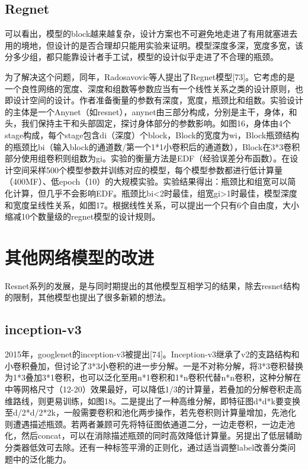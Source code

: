 \documentclass[15pt]{article}
\begin{document}
\subsection{Regnet}
可以看出，模型的block越来越复杂，设计方案也不可避免地走进了有用就塞进去用的境地，但设计的是否合理却只能用实验来证明。模型深度多深，宽度多宽，该分多少组，都只能靠设计者手工试，模型的设计似乎走进了不合理的瓶颈。

为了解决这个问题，同年，Radosavovic等人提出了Regnet模型[73]。它考虑的是一个良性网络的宽度、深度和组数等参数应当有一个线性关系之类的设计原则，也即设计空间的设计。作者准备衡量的参数有深度，宽度，瓶颈比和组数。实验设计的主体是一个Anynet（如resnet），anynet由三部分构成，分别是主干，身体，和头，我们保持主干和头部固定，探讨身体部分的参数影响。如图16，身体由4个stage构成，每个stage包含di（深度）个block，Block的宽度为wi，Block瓶颈结构的瓶颈比bi（输入block的通道数/第一个1*1小卷积后的通道数），Block在3*3卷积部分使用组卷积则组数为gi。实验的衡量方法是EDF（经验误差分布函数）。在设计空间采样500个模型参数并训练对应的模型，每个模型参数都进行低计算量（400MF）、低epoch（10）的大规模实验。实验结果得出：瓶颈比和组宽可以简化计算，但几乎不会影响EDF。瓶颈比bi<2时最佳，组宽gi>1时最佳，模型深度和宽度呈线性关系，如图17。根据线性关系，可以提出一个只有6个自由度，大小缩减10个数量级的regnet模型的设计规则。

\section{其他网络模型的改进}
Resnet系列的发展，是与同时期提出的其他模型互相学习的结果，除去resnet结构的限制，其他模型也提出了很多新颖的想法。

\subsection{inception-v3}
2015年，googlenet的inception-v3被提出[74]。Inception-v3继承了v2的支路结构和小卷积叠加，但讨论了3*3小卷积的进一步分解。一是不对称分解，将3*3卷积替换为1*3叠加3*1卷积，也可以泛化至用n*1卷积和1*n卷积代替n*n卷积，这种分解在中等网格尺寸（12-20）效果最好，可以降低1/3的计算量，若叠加的分解卷积走高维路线，则更易训练，如图18。二是提出了一种高维分解，即特征图d*d*k要变换至d/2*d/2*2k，一般需要卷积和池化两步操作，若先卷积则计算量增加，先池化则遭遇描述瓶颈。若两者兼顾可先将特征图依通道二分，一边走卷积，一边走池化，然后concat，可以在消除描述瓶颈的同时高效降低计算量。另提出了低层辅助分类器低效可去除。还有一种标签平滑的正则化，通过适当调整label改善分类问题中的泛化能力。
\end{document}
